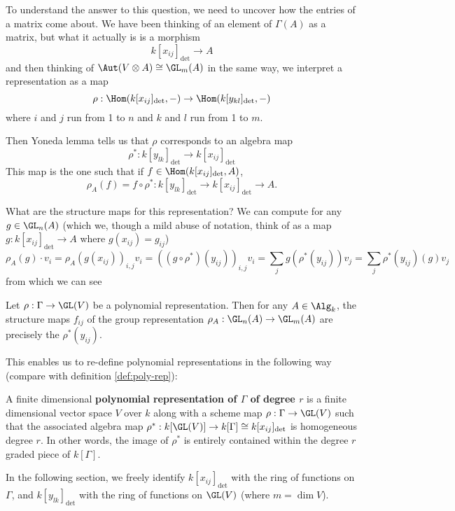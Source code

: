 \documentclass[12pt]{article}
\begin{document}
To understand the answer to this question, we need to uncover how the entries of a matrix come about. We have been thinking of an element of 
$\Gamma(A)$ as a matrix, but what it actually is is a morphism 
\[k[x_{ij}]_{\det}\to A\]
and then thinking of $\Aut(V\otimes A)\cong\GL_m(A)$ in the same way, we interpret a representation 
as a map 
\[\rho:\Hom(k[x_{ij}]_{\det},-)\to \Hom(k[y_{kl}]_{\det},-)\]
where $i$ and $j$ run from 1 to $n$ and $k$ and $l$ run from 1 to $m$. 

Then Yoneda lemma tells us that $\rho$ corresponds to an algebra map
\[\rho^\ast:k[y_{lk}]_{\det}\to k[x_{ij}]_{\det}\]
This map is the one such that if $f\in\Hom(k[x_{ij}]_{\det},A)$,
\[\rho_A(f)=f\circ\rho^\ast:k[y_{lk}]_{\det}\to k[x_{ij}]_{\det}\to A.\]

What are the structure maps for this representation? We can compute for any $g\in \GL_n(A)$ (which we, though a mild
abuse of notation, think of as a map $g:k[x_{ij}]_{\det}\to A$ where $g(x_{ij})=g_{ij}$)
\[\rho_A(g)\cdot v_i=\rho_A(g(x_{ij}))_{i,j}v_i=((g\circ\rho^\ast)(y_{ij}))_{i,j}v_i=\sum_j g(\rho^\ast(y_{ij}))v_j=\sum_j\rho^\ast(y_{ij})(g)v_j\]
from which we can see
\begin{lem}
	Let $\rho:\Gamma\to \GL(V)$ be a polynomial representation. Then for any $A\in\Alg_k$, the structure maps $f_{ij}$ 
	of the group representation $\rho_A:\GL_n(A)\to \GL_m(A)$ are precisely the $\rho^\ast(y_{ij})$.
\end{lem}

This enables us to re-define polynomial representations 
in the following way (compare with definition \ref{def:poly-rep}):
\begin{defn}\label{def:poly-rep-new}
	A finite dimensional \textbf{polynomial representation of $\Gamma$ of degree $r$} is a finite dimensional vector space $V$ 
	over $k$ along with a scheme map $\rho:\Gamma\to \GL(V)$ such that the associated algebra map $\rho^\ast:k[\GL(V)]\to k[\Gamma]\cong k[x_{ij}]_{\det}$ is homogeneous 
	degree $r$. In other words, the image of $\rho^\ast$ is entirely contained within the degree $r$ graded piece of $k[\Gamma]$.
\end{defn}

\begin{rmk}
	In the following section, we freely identify $k[x_{ij}]_{\det}$ with the ring of functions on $\Gamma$, and $k[y_{lk}]_{\det}$ with 
	the ring of functions on $\GL(V)$ (where $m=\dim V$).
\end{rmk}
\end{document}
